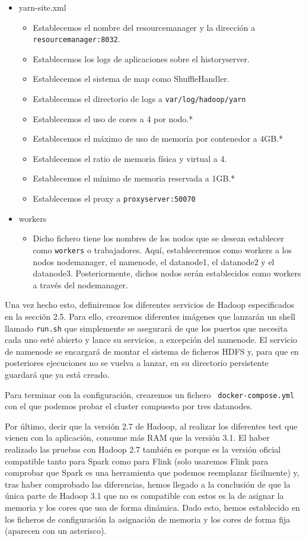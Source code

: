 \begin{itemize}
\item yarn-site.xml
  \begin{itemize}
  \item Establecemos el nombre del resourcemanager y la dirección a
    {\tt resourcemanager:8032}.
  \item Establecemos los logs de aplicaciones sobre el historyserver.
  \item Establecemos el sistema de map como ShuffleHandler.
  \item Establecemos el directorio de logs a {\tt var/log/hadoop/yarn}
  \item Establecemos el uso de cores a 4 por nodo.*
  \item Establecemos el máximo de uso de memoria por contenedor a 4GB.*
  \item Establecemos el ratio de memoria física y virtual a 4.
  \item Establecemos el mínimo de memoria reservada a 1GB.*
  \item Establecemos el proxy a {\tt proxyserver:50070}
  \end{itemize}

\item workers
  \begin{itemize}
  \item Dicho fichero tiene los nombres de los nodos que se desean
    establecer como {\tt workers} o trabajadores. Aquí, estableceremos como
    workers a los nodos nodemanager, el namenode, el datanode1, el
    datanode2 y el datanode3. Posteriormente, dichos nodos serán
    establecidos como workers a través del nodemanager.
  \end{itemize}
\end{itemize}

Una vez hecho esto, definiremos los diferentes servicios de Hadoop
especificados en la sección 2.5. Para ello, crearemos diferentes imágenes
que lanzarán un shell llamado {\tt run.sh} que simplemente se asegurará de que
los puertos que necesita cada uno esté abierto y lance su servicios, a
excepción del namenode. El servicio de namenode se encargará de montar el
sistema de ficheros HDFS y, para que en posteriores ejecuciones no se
vuelva a lanzar, en su directorio persistente guardará que ya está creado.

Para terminar con la configuración, crearemos un fichero {\tt
  docker-compose.yml} con el que podemos probar el cluster compuesto por
tres datanodes.

Por último, decir que la versión 2.7 de Hadoop, al realizar los diferentes
test que vienen con la aplicación, consume más RAM que la versión 3.1. El
haber realizado las pruebas con Hadoop 2.7 también es porque es la versión
oficial compatible tanto para Spark como para Flink (solo usaremos Flink
para comprobar que Spark es una herramienta que podemos reemplazar
fácilmente) y, tras haber comprobado las diferencias, hemos llegado a la
conclusión de que la única parte de Hadoop 3.1 que no es compatible con
estos es la de asignar la memoria y los cores que usa de forma dinámica.
Dado esto, hemos establecido en los ficheros de configuración la asignación
de memoria y los cores de forma fija (aparecen con un asterisco).


